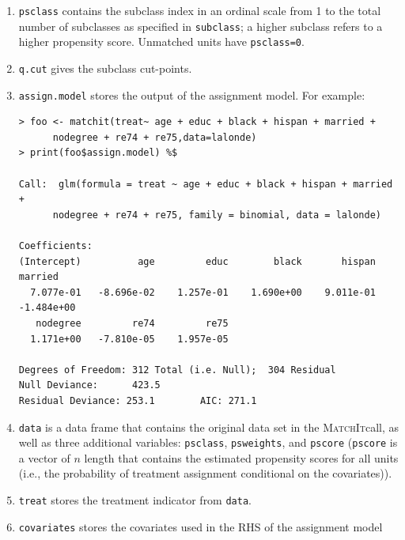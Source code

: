 \documentclass[oneside,letterpaper,titlepage]{article}
\newcommand{\MatchIt}{\textsc{MatchIt}}
\begin{document}
\begin{enumerate}
 \item \texttt{psclass} contains the subclass index in an ordinal
   scale from 1 to the total number of subclasses as specified in
   \texttt{subclass}; a higher subclass refers to a higher propensity
   score.  Unmatched units have \texttt{psclass=0}.
   
 \item \texttt{q.cut} gives the subclass cut-points.
   
 \item \texttt{assign.model} stores the output of the assignment
   model.  For example:
  
  \begin{footnotesize}
\begin{verbatim}
> foo <- matchit(treat~ age + educ + black + hispan + married +
      nodegree + re74 + re75,data=lalonde)
> print(foo$assign.model) %$

Call:  glm(formula = treat ~ age + educ + black + hispan + married +
      nodegree + re74 + re75, family = binomial, data = lalonde) 

Coefficients:
(Intercept)          age         educ        black       hispan      married  
  7.077e-01   -8.696e-02    1.257e-01    1.690e+00    9.011e-01   -1.484e+00  
   nodegree         re74         re75  
  1.171e+00   -7.810e-05    1.957e-05  

Degrees of Freedom: 312 Total (i.e. Null);  304 Residual
Null Deviance:      423.5 
Residual Deviance: 253.1        AIC: 271.1 
\end{verbatim}
\end{footnotesize}

\item \texttt{data} is a data frame that contains the original data
  set in the \MatchIt call, as well as three additional variables:
  \texttt{psclass}, \texttt{psweights}, and \texttt{pscore}
  (\texttt{pscore} is a vector of $n$ length that contains the
  estimated propensity scores for all units (i.e., the probability of
  treatment assignment conditional on the covariates)).

\item \texttt{treat} stores the treatment indicator from \texttt{data}.

\item \texttt{covariates} stores the covariates used in the RHS of the
  assignment model
\end{enumerate}
\end{document}
